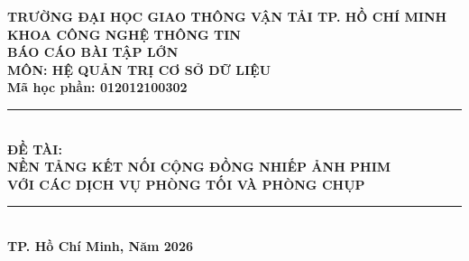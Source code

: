\documentclass[letterpaper,12pt,leqno]{report}
\begin{document}
\begin{titlepage}
    \centering
    \Large\textbf{TRƯỜNG ĐẠI HỌC GIAO THÔNG VẬN TẢI TP. HỒ CHÍ MINH}\\[0.2cm]
    \large\textbf{KHOA CÔNG NGHỆ THÔNG TIN}\\[0.9cm]

    \Huge\textbf{BÁO CÁO BÀI TẬP LỚN}\\[0.3cm]
    \Large\textbf{MÔN: HỆ QUẢN TRỊ CƠ SỞ DỮ LIỆU}\\[0.2cm]
    \large\textbf{Mã học phần: 012012100302}\\[0.8cm]

    \rule{\linewidth}{1.5pt}\\[0.35cm]
    \large\textbf{ĐỀ TÀI:}\\[0.35cm]
    \normalsize\textbf{NỀN TẢNG KẾT NỐI CỘNG ĐỒNG NHIẾP ẢNH PHIM}\\
    \normalsize\textbf{VỚI CÁC DỊCH VỤ PHÒNG TỐI VÀ PHÒNG CHỤP}\\[0.35cm]
    \rule{\linewidth}{1.5pt}\\[1.5cm]
    
    \vfill
    \Large\textbf{TP. Hồ Chí Minh, Năm 2026}
\end{titlepage}

\cleardoublepage
{}

\tableofcontents
\cleardoublepage




\cleardoublepage


\cleardoublepage



\cleardoublepage


\cleardoublepage


\cleardoublepage


\cleardoublepage
\end{document}
